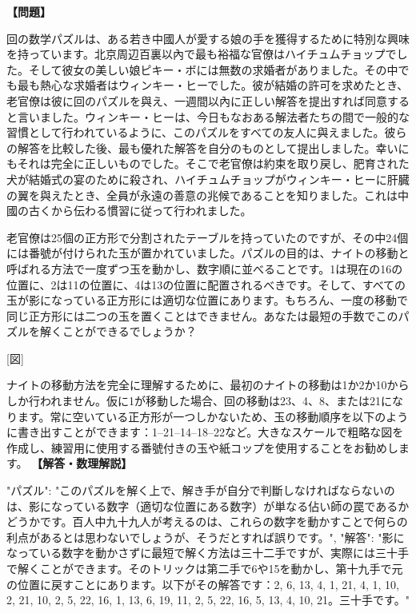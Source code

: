 \documentclass[10pt,a4paper,oneside,openany]{ltjsbook}
\begin{document}
\begin{tcolorbox}[colback=softblue,colframe=primaryblue,title=\textbf{第 342 問：THE MANDARIN'S PUZZLE.},arc=2mm,boxrule=1pt,breakable]
\textbf{【問題】}\par\vspace{0.3em}
回の数学パズルは、ある若き中國人が愛する娘の手を獲得するために特別な興味を持っています。北京周辺百裏以內で最も裕福な官僚はハイチュムチョップでした。そして彼女の美しい娘ピキー・ボには無数の求婚者がありました。その中でも最も熱心な求婚者はウィンキー・ヒーでした。彼が結婚の許可を求めたとき、老官僚は彼に回のパズルを與え、一週間以內に正しい解答を提出すれば同意すると言いました。ウィンキー・ヒーは、今日もなおある解法者たちの間で一般的な習慣として行われているように、このパズルをすべての友人に與えました。彼らの解答を比較した後、最も優れた解答を自分のものとして提出しました。幸いにもそれは完全に正しいものでした。そこで老官僚は約束を取り戻し、肥育された犬が結婚式の宴のために殺され、ハイチュムチョップがウィンキー・ヒーに肝臓の翼を與えたとき、全員が永遠の善意の兆候であることを知りました。これは中國の古くから伝わる慣習に従って行われました。

老官僚は25個の正方形で分割されたテーブルを持っていたのですが、その中24個には番號が付けられた玉が置かれていました。パズルの目的は、ナイトの移動と呼ばれる方法で一度ずつ玉を動かし、数字順に並べることです。1は現在の16の位置に、2は11の位置に、4は13の位置に配置されるべきです。そして、すべての玉が影になっている正方形には適切な位置にあります。もちろん、一度の移動で同じ正方形には二つの玉を置くことはできません。あなたは最短の手数でこのパズルを解くことができるでしょうか？

[図]

ナイトの移動方法を完全に理解するために、最初のナイトの移動は1か2か10からしか行われません。仮に1が移動した場合、回の移動は23、4、8、または21になります。常に空いている正方形が一つしかないため、玉の移動順序を以下のように書き出すことができます：1--21--14--18--22など。大きなスケールで粗略な図を作成し、練習用に使用する番號付きの玉や紙コップを使用することをお勧めします。
\tcblower
\textbf{【解答・数理解説】}\par\vspace{0.3em}
{
"パズル": "このパズルを解く上で、解き手が自分で判斷しなければならないのは、影になっている数字（適切な位置にある数字）が単なる佔い師の罠であるかどうかです。百人中九十九人が考えるのは、これらの数字を動かすことで何らの利点があるとは思わないでしょうが、そうだとすれば誤りです。",
"解答": "影になっている数字を動かさずに最短で解く方法は三十二手ですが、実際には三十手で解くことができます。そのトリックは第二手で6や15を動かし、第十九手で元の位置に戻すことにあります。以下がその解答です：2, 6, 13, 4, 1, 21, 4, 1, 10, 2, 21, 10, 2, 5, 22, 16, 1, 13, 6, 19, 11, 2, 5, 22, 16, 5, 13, 4, 10, 21。三十手です。"
}
\end{tcolorbox}
\end{document}
